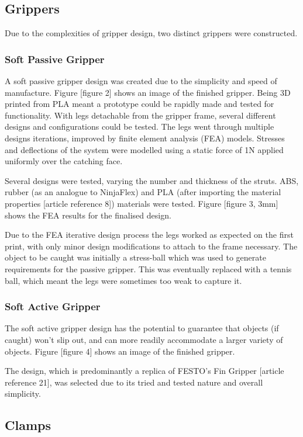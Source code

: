 \documentclass[conference]{IEEEtran}
\begin{document}
	\subsection{Grippers}
	Due to the complexities of gripper design, two distinct grippers were constructed.
	\subsubsection{Soft Passive Gripper}
	A soft passive gripper design was created due to the simplicity and speed of manufacture. Figure [figure 2] shows an image of the finished gripper.
	Being 3D printed from PLA meant a prototype could be rapidly made and tested for functionality. With legs detachable from the gripper frame, several different designs and configurations could be tested. The legs went through multiple designs iterations, improved by finite element analysis (FEA) models. Stresses and deflections of the system were modelled using a static force of 1N applied uniformly over the catching face.
	
	Several designs were tested, varying the number and thickness of the struts. ABS, rubber (as an analogue to NinjaFlex) and PLA (after importing the material properties [article reference 8]) materials were tested. Figure [figure 3, 3mm] shows the FEA results for the finalised design.
	
	Due to the FEA iterative design process the legs worked as expected on the first print, with only minor design modifications to attach to the frame necessary. The object to be caught was initially a stress-ball which was used to generate requirements for the passive gripper. This was eventually replaced with a tennis ball, which meant the legs were sometimes too weak to capture it. 
	\subsubsection{Soft Active Gripper}
	The soft active gripper design has the potential to guarantee that objects (if caught) won’t slip out, and can more readily accommodate a larger variety of objects. Figure [figure 4] shows an image of the finished gripper.
	
	The design, which is predominantly a replica of FESTO’s Fin Gripper [article reference 21], was selected due to its tried and tested nature and overall simplicity. 
	
	
	\subsection{Clamps}
	
\end{document}
